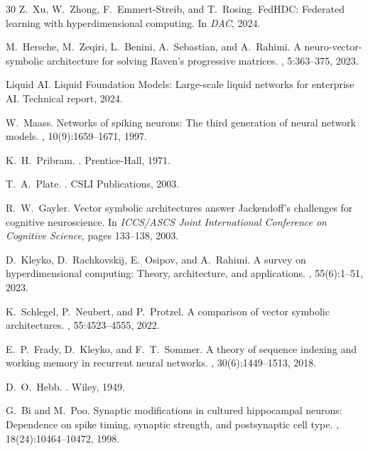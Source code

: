 \documentclass{article}
\begin{document}
\begin{thebibliography}{30}
Z.~Xu, W.~Zhong, F.~Emmert-Streib, and T.~Rosing.
\newblock FedHDC: Federated learning with hyperdimensional computing.
\newblock In {\em DAC}, 2024.

M.~Hersche, M.~Zeqiri, L.~Benini, A.~Sebastian, and A.~Rahimi.
\newblock A neuro-vector-symbolic architecture for solving Raven's progressive matrices.
, 5:363--375, 2023.

Liquid AI.
\newblock Liquid Foundation Models: Large-scale liquid networks for enterprise AI.
\newblock Technical report, 2024.

W.~Maass.
\newblock Networks of spiking neurons: The third generation of neural network models.
, 10(9):1659--1671, 1997.

K.~H.~Pribram.
.
\newblock Prentice-Hall, 1971.

T.~A.~Plate.
.
\newblock CSLI Publications, 2003.

R.~W.~Gayler.
\newblock Vector symbolic architectures answer Jackendoff's challenges for cognitive neuroscience.
\newblock In {\em ICCS/ASCS Joint International Conference on Cognitive Science}, pages 133--138, 2003.

D.~Kleyko, D.~Rachkovskij, E.~Osipov, and A.~Rahimi.
\newblock A survey on hyperdimensional computing: Theory, architecture, and applications.
, 55(6):1--51, 2023.

K.~Schlegel, P.~Neubert, and P.~Protzel.
\newblock A comparison of vector symbolic architectures.
, 55:4523--4555, 2022.

E.~P.~Frady, D.~Kleyko, and F.~T.~Sommer.
\newblock A theory of sequence indexing and working memory in recurrent neural networks.
, 30(6):1449--1513, 2018.

D.~O.~Hebb.
.
\newblock Wiley, 1949.

G.~Bi and M.~Poo.
\newblock Synaptic modifications in cultured hippocampal neurons: Dependence on spike timing, synaptic strength, and postsynaptic cell type.
, 18(24):10464--10472, 1998.


\end{thebibliography}
\end{document}
